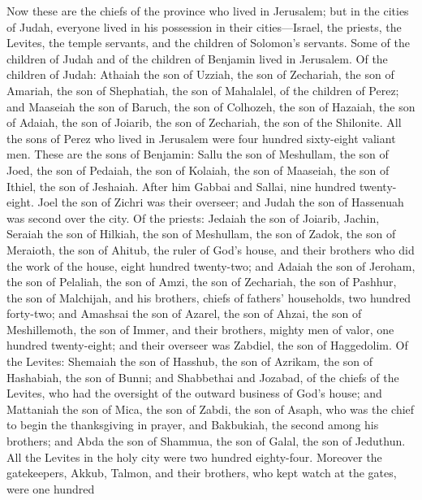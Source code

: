  Now these are the chiefs of the province who lived in
Jerusalem; but in the cities of Judah, everyone lived in his possession
in their cities---Israel, the priests, the Levites, the temple servants,
and the children of Solomon's servants.  Some of the
children of Judah and of the children of Benjamin lived in Jerusalem. Of
the children of Judah: Athaiah the son of Uzziah, the son of Zechariah,
the son of Amariah, the son of Shephatiah, the son of Mahalalel, of the
children of Perez;  and Maaseiah the son of Baruch, the
son of Colhozeh, the son of Hazaiah, the son of Adaiah, the son of
Joiarib, the son of Zechariah, the son of the Shilonite. 
All the sons of Perez who lived in Jerusalem were four hundred
sixty-eight valiant men.  These are the sons of Benjamin:
Sallu the son of Meshullam, the son of Joed, the son of Pedaiah, the son
of Kolaiah, the son of Maaseiah, the son of Ithiel, the son of Jeshaiah.
 After him Gabbai and Sallai, nine hundred twenty-eight.
 Joel the son of Zichri was their overseer; and Judah the
son of Hassenuah was second over the city.  Of the
priests: Jedaiah the son of Joiarib, Jachin,  Seraiah the
son of Hilkiah, the son of Meshullam, the son of Zadok, the son of
Meraioth, the son of Ahitub, the ruler of God's house, 
and their brothers who did the work of the house, eight hundred
twenty-two; and Adaiah the son of Jeroham, the son of Pelaliah, the son
of Amzi, the son of Zechariah, the son of Pashhur, the son of Malchijah,
 and his brothers, chiefs of fathers' households, two
hundred forty-two; and Amashsai the son of Azarel, the son of Ahzai, the
son of Meshillemoth, the son of Immer,  and their
brothers, mighty men of valor, one hundred twenty-eight; and their
overseer was Zabdiel, the son of Haggedolim.  Of the
Levites: Shemaiah the son of Hasshub, the son of Azrikam, the son of
Hashabiah, the son of Bunni;  and Shabbethai and Jozabad,
of the chiefs of the Levites, who had the oversight of the outward
business of God's house;  and Mattaniah the son of Mica,
the son of Zabdi, the son of Asaph, who was the chief to begin the
thanksgiving in prayer, and Bakbukiah, the second among his brothers;
and Abda the son of Shammua, the son of Galal, the son of Jeduthun.
 All the Levites in the holy city were two hundred
eighty-four.  Moreover the gatekeepers, Akkub, Talmon,
and their brothers, who kept watch at the gates, were one hundred

